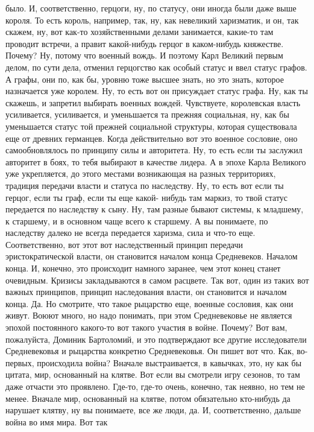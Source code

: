 было. И, соответственно, герцоги, ну, по статусу, они иногда были даже выше
короля. То есть король, например, так, ну, как невеликий харизматик, и он, так
скажем, ну, вот как-то хозяйственными делами занимается, какие-то там проводит
встречи, а правит какой-нибудь герцог в каком-нибудь княжестве. Почему? Ну,
потому что военный вождь. И поэтому Карл Великий первым делом, по сути дела,
отменил герцогство как особый статус и ввел статус графов. А графы, они по, как
бы, уровню тоже высшее знать, но это знать, которое назначается уже королем. Ну,
то есть вот он присуждает статус графа. Ну, как ты скажешь, и запретил выбирать
военных вождей. Чувствуете, королевская власть усиливается, усиливается, и
уменьшается та прежняя социальная, ну, как бы уменьшается статус той прежней
социальной структуры, которая существовала еще от древних германцев. Когда
действительно вот это военное сословие, оно самообновлялось по принципу силы и
авторитета. Ну, то есть если ты заслужил авторитет в боях, то тебя выбирают в
качестве лидера. А в эпохе Карла Великого уже укрепляется, до этого местами
возникающая на разных территориях, традиция передачи власти и статуса по
наследству. Ну, то есть вот если ты герцог, если ты граф, если ты еще какой-
нибудь там маркиз, то твой статус передается по наследству к сыну. Ну, там
разные бывают системы, к младшему, к старшему, и в основном чаще всего к
старшему. А вы понимаете, по наследству далеко не всегда передается харизма,
сила и что-то еще. Соответственно, вот этот вот наследственный принцип передачи
эристократической власти, он становится началом конца Средневеков. Началом
конца. И, конечно, это происходит намного заранее, чем этот конец станет
очевидным. Кризисы закладываются в самом расцвете. Так вот, один из таких вот
важных принципов, принцип наследования власти, он становится и началом конца.
Да. Но смотрите, что такое рыцарство еще, военные сословия, как они живут. Воюют
много, но надо понимать, при этом Средневековье не является эпохой постоянного
какого-то вот такого участия в войне. Почему? Вот вам, пожалуйста, Доминик
Бартоломий, и это подтверждают все другие исследователи Средневековья и
рыцарства конкретно Средневековья. Он пишет вот что. Как, во-первых, происходила
война? Вначале выстраивается, в кавычках, это, ну как бы цитата, мир, основанный
на клятве. Вот если вы смотрели игру сезонов, то там даже отчасти это проявлено.
Где-то, где-то очень, конечно, так неявно, но тем не менее. Вначале мир,
основанный на клятве, потом обязательно кто-нибудь да нарушает клятву, ну вы
понимаете, все же люди, да. И, соответственно, дальше война во имя мира. Вот так
